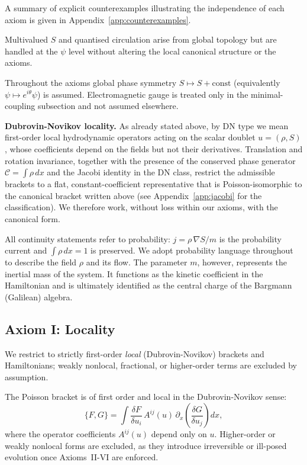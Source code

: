 \documentclass[11pt,a4paper]{article}
\numberwithin{equation}{section}
\theoremstyle{thmcompact}
\theoremstyle{remark}
\begin{document}
A summary of explicit counterexamples illustrating the independence of	each axiom is given in Appendix~\ref{app:counterexamples}.

Multivalued $S$ and quantised circulation arise from global topology but are handled at the $\psi$ level without altering the local canonical structure or the axioms.

Throughout the axioms global phase symmetry $S\mapsto S+\text{const}$ (equivalently $\psi\mapsto e^{i\theta}\psi$) is assumed. Electromagnetic gauge is treated only in the minimal-coupling subsection and not assumed elsewhere.

\smallskip

\textbf{Dubrovin-Novikov locality.}
As already stated above, by DN type we mean first-order local hydrodynamic operators acting on the scalar doublet $u=(\rho,S)$, whose coefficients depend on the fields but not their derivatives. Translation and rotation invariance, together with the presence of the conserved phase generator $\mathcal C=\!\int\rho\,dx$ and the Jacobi identity in the DN class, restrict the admissible brackets to a flat, constant-coefficient representative that is Poisson-isomorphic to the canonical bracket written above (see Appendix~\ref{app:jacobi} for the classification). We therefore work, without loss within our axioms, with the canonical form.


\smallskip

All continuity statements refer to probability: $j=\rho\,\nabla S/m$ is the probability current and $\int\rho\,dx=1$ is preserved. We adopt probability language throughout to describe the field $\rho$ and its flow. The parameter $m$, however, represents the inertial mass of the system. It functions as the kinetic coefficient in the Hamiltonian and is ultimately identified as the central charge of the Bargmann (Galilean) algebra.	
	
	\subsection*{Axiom I: Locality}
	We restrict to strictly first-order \emph{local} (Dubrovin-Novikov) brackets and Hamiltonians; weakly nonlocal, fractional, or higher-order terms are excluded by assumption.
	
	The Poisson bracket is of first order and local in the Dubrovin-Novikov sense:
	\[
	\{F,G\}
	=\!\int\! \frac{\delta F}{\delta u_i}\,A^{ij}(u)\,\partial_x\!\left(\frac{\delta G}{\delta u_j}\right)dx,
	\]
	where the operator coefficients $A^{ij}(u)$ depend only on $u$.
	Higher-order or weakly nonlocal forms are excluded, as they introduce irreversible or ill-posed evolution once Axioms~II-VI are enforced.
	
\end{document}
